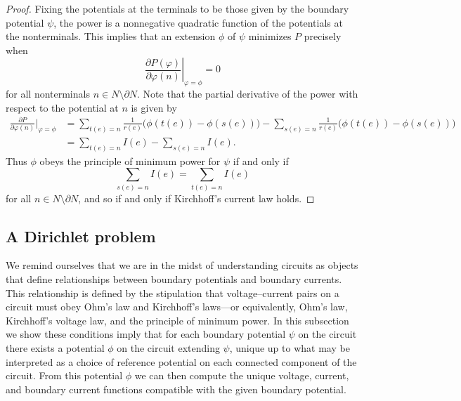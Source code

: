 \begin{proof}
Fixing the potentials at the terminals to be those given by the boundary
potential $\psi$, the power is a nonnegative quadratic function of the
potentials at the nonterminals. This implies that an extension $\phi$ of $\psi$
minimizes $P$ precisely when 
\[ \left. \frac{\partial P(\varphi)}{\partial \varphi(n)}\right|_{\varphi = \phi} = 0 \]
for all nonterminals $n \in N \setminus \partial N$. Note that the
partial derivative of the power with respect to the potential at $n$ is given by 
\begin{align*}
  \frac{\partial P}{\partial \varphi(n)}\bigg|_{\varphi = \phi} 
  &= \sum_{t(e) = n} \frac1{r(e)}\big(\phi(t(e))-\phi(s(e))\big) - \sum_{s(e) =
  n} \frac1{r(e)}\big(\phi(t(e))-\phi(s(e))\big) \\
  &= \sum_{t(e) = n} I(e) - \sum_{s(e) = n} I(e).
\end{align*}
Thus $\phi$ obeys the principle of minimum power for $\psi$ if and only if
\[ \sum_{s(e) = n} I(e) = \sum_{t(e) = n} I(e)\] 
for all $n \in N \setminus \partial N$, and so if and only if Kirchhoff's current law holds.
\end{proof}

\subsection{A Dirichlet problem}

We remind ourselves that we are in the midst of understanding circuits as objects that define relationships between boundary potentials and boundary currents. This relationship is defined by the stipulation that voltage--current pairs on a circuit must obey Ohm's law and Kirchhoff's laws---or equivalently, Ohm's law, Kirchhoff's voltage law, and the principle of minimum power. In this subsection we show these conditions imply that for each boundary potential $\psi$ on the circuit there exists a potential $\phi$ on the circuit extending $\psi$, unique up to what may be interpreted as a choice of reference potential on each connected component of the circuit. From this potential $\phi$ we can then compute the unique voltage, current, and boundary current functions compatible with the given boundary potential.

